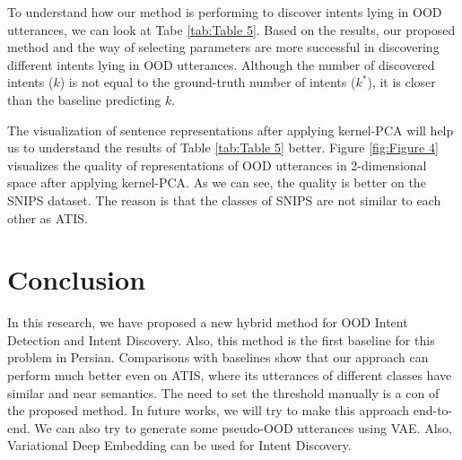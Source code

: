 \documentclass{article}
\begin{document}
To understand how our method is performing to discover intents lying in OOD utterances, we can look at Tabe \ref{tab:Table 5}.
Based on the results, our proposed method and the way of selecting parameters are more successful in discovering different intents lying in OOD utterances.
Although the number of discovered intents ($k$) is not equal to the ground-truth number of intents ($k^*$), it is closer than the baseline predicting $k$.

The visualization of sentence representations after applying kernel-PCA will help us to understand the results of Table \ref{tab:Table 5} better.
Figure \ref{fig:Figure 4} visualizes the quality of representations of OOD utterances in 2-dimensional space after applying kernel-PCA.
As we can see, the quality is better on the SNIPS dataset. The reason is that the classes of SNIPS are not similar to each other as ATIS.

\section{Conclusion}\label{conclustion}

In this research, we have proposed a new hybrid method for OOD Intent Detection and Intent Discovery.
Also, this method is the first baseline for this problem in Persian.
Comparisons with baselines show that our approach can perform much better even on ATIS, where its utterances of different classes have similar and near semantics.
The need to set the threshold manually is a con of the proposed method.
In future works, we will try to make this approach end-to-end.
We can also try to generate some pseudo-OOD utterances using VAE.
Also, Variational Deep Embedding can be used for Intent Discovery.



  
\end{document}
